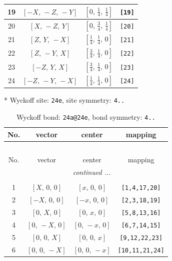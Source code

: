 \documentclass[fleqn,8pt]{jsarticle}
\begin{document}
\begin{longtable}{cccc}
19 & $\left[ - X,\, - Z,\, - Y \right]$ & $\left[ 0,\, \frac{1}{4},\, \frac{1}{4} \right]$ & {\tt [19]} \\ \hline
20 & $\left[ X,\, - Z,\, Y \right]$ & $\left[ 0,\, \frac{3}{4},\, \frac{1}{4} \right]$ & {\tt [20]} \\ \hline
21 & $\left[ Z,\, Y,\, - X \right]$ & $\left[ \frac{1}{4},\, \frac{1}{4},\, 0 \right]$ & {\tt [21]} \\ \hline
22 & $\left[ Z,\, - Y,\, X \right]$ & $\left[ \frac{3}{4},\, \frac{1}{4},\, 0 \right]$ & {\tt [22]} \\ \hline
23 & $\left[ - Z,\, Y,\, X \right]$ & $\left[ \frac{3}{4},\, \frac{1}{4},\, 0 \right]$ & {\tt [23]} \\ \hline
24 & $\left[ - Z,\, - Y,\, - X \right]$ & $\left[ \frac{1}{4},\, \frac{1}{4},\, 0 \right]$ & {\tt [24]} \\
\end{longtable}
* Wyckoff site: {\tt 24e}, site symmetry: {\tt 4..}
\renewcommand{\arraystretch}{1.2}
\begin{longtable}{cccc}
\caption{Wyckoff bond: {\tt 24a@24e}, bond symmetry: {\tt 4..}}
 \\
 \hline \hline
No. & vector & center & mapping \\ \hline \endfirsthead

\multicolumn{3}{l}{\tablename\ \thetable{}} \\
 \hline \hline
No. & vector & center & mapping \\ \hline \endhead

 \hline \hline
\multicolumn{3}{r}{\footnotesize\it continued ...} \\ \endfoot

 \hline \hline
\multicolumn{3}{r}{} \\ \endlastfoot

1 & $\left[ X,\, 0,\, 0 \right]$ & $\left[ x,\, 0,\, 0 \right]$ & {\tt [1,4,17,20]} \\ \hline
2 & $\left[ - X,\, 0,\, 0 \right]$ & $\left[ - x,\, 0,\, 0 \right]$ & {\tt [2,3,18,19]} \\ \hline
3 & $\left[ 0,\, X,\, 0 \right]$ & $\left[ 0,\, x,\, 0 \right]$ & {\tt [5,8,13,16]} \\ \hline
4 & $\left[ 0,\, - X,\, 0 \right]$ & $\left[ 0,\, - x,\, 0 \right]$ & {\tt [6,7,14,15]} \\ \hline
5 & $\left[ 0,\, 0,\, X \right]$ & $\left[ 0,\, 0,\, x \right]$ & {\tt [9,12,22,23]} \\ \hline
6 & $\left[ 0,\, 0,\, - X \right]$ & $\left[ 0,\, 0,\, - x \right]$ & {\tt [10,11,21,24]} \\
\end{longtable}
\end{document}
